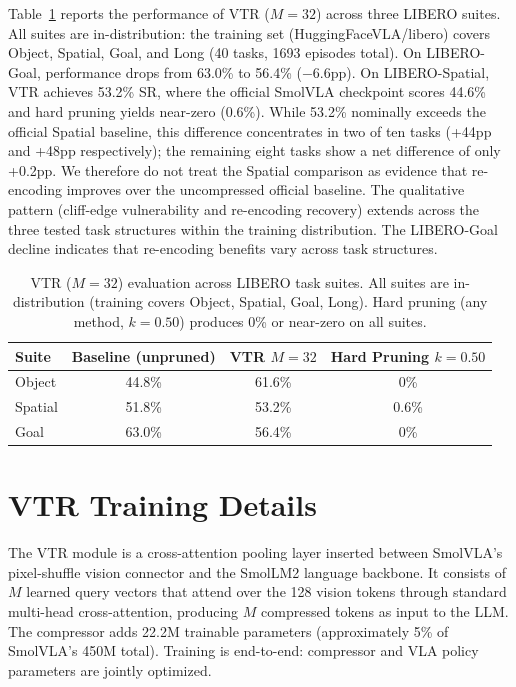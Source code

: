 Table~\ref{tab:cross_suite} reports the performance of VTR ($M{=}32$) across three LIBERO suites. All suites are in-distribution: the training set (HuggingFaceVLA/libero) covers Object, Spatial, Goal, and Long (40 tasks, 1693 episodes total). On LIBERO-Goal, performance drops from 63.0\% to 56.4\% ($-6.6$pp). On LIBERO-Spatial, VTR achieves 53.2\% SR, where the official SmolVLA checkpoint scores 44.6\% and hard pruning yields near-zero (0.6\%). While 53.2\% nominally exceeds the official Spatial baseline, this difference concentrates in two of ten tasks (+44pp and +48pp respectively); the remaining eight tasks show a net difference of only +0.2pp. We therefore do not treat the Spatial comparison as evidence that re-encoding improves over the uncompressed official baseline. The qualitative pattern (cliff-edge vulnerability and re-encoding recovery) extends across the three tested task structures within the training distribution. The LIBERO-Goal decline indicates that re-encoding benefits vary across task structures.

\begin{table}[ht]
\centering
\small
\caption{VTR ($M{=}32$) evaluation across LIBERO task suites. All suites are in-distribution (training covers Object, Spatial, Goal, Long). Hard pruning (any method, $k{=}0.50$) produces 0\% or near-zero on all suites.}
\label{tab:cross_suite}
\begin{tabular}{lccc}
\toprule
Suite & Baseline (unpruned) & VTR $M{=}32$ & Hard Pruning $k{=}0.50$ \\
\midrule
Object & 44.8\% & 61.6\% & 0\% \\
Spatial & 51.8\% & 53.2\% & 0.6\% \\
Goal & 63.0\% & 56.4\% & 0\% \\
\bottomrule
\end{tabular}
\end{table}


\section{VTR Training Details}
\label{app:smart_compress_details}

The VTR module is a cross-attention pooling layer inserted between SmolVLA's pixel-shuffle vision connector and the SmolLM2 language backbone. It consists of $M$ learned query vectors that attend over the 128 vision tokens through standard multi-head cross-attention, producing $M$ compressed tokens as input to the LLM. The compressor adds 22.2M trainable parameters (approximately 5\% of SmolVLA's 450M total). Training is end-to-end: compressor and VLA policy parameters are jointly optimized.

